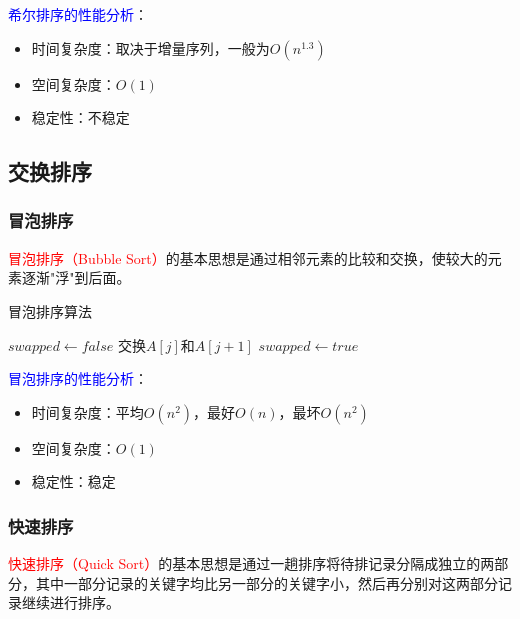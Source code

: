 \documentclass{../../note}
\begin{document}
\textcolor{blue}{希尔排序的性能分析}：
\begin{itemize}
  \item 时间复杂度：取决于增量序列，一般为$O(n^{1.3})$
  \item 空间复杂度：$O(1)$
  \item 稳定性：不稳定
\end{itemize}

\subsection{交换排序}

\subsubsection{冒泡排序}
\textcolor{red}{冒泡排序（Bubble Sort）}的基本思想是通过相邻元素的比较和交换，使较大的元素逐渐"浮"到后面。

\begin{algorithm}
  \caption{冒泡排序算法}
  \begin{algorithmic}[1]
    \State $swapped \gets false$
    \State 交换$A[j]$和$A[j+1]$
    \State $swapped \gets true$
    \EndIf
    \EndFor
    \State \Return {}
    \EndIf
    \EndFor
    \EndProcedure
  \end{algorithmic}
\end{algorithm}

\textcolor{blue}{冒泡排序的性能分析}：
\begin{itemize}
  \item 时间复杂度：平均$O(n^2)$，最好$O(n)$，最坏$O(n^2)$
  \item 空间复杂度：$O(1)$
  \item 稳定性：稳定
\end{itemize}

\subsubsection{快速排序}
\textcolor{red}{快速排序（Quick Sort）}的基本思想是通过一趟排序将待排记录分隔成独立的两部分，其中一部分记录的关键字均比另一部分的关键字小，然后再分别对这两部分记录继续进行排序。
\end{document}
